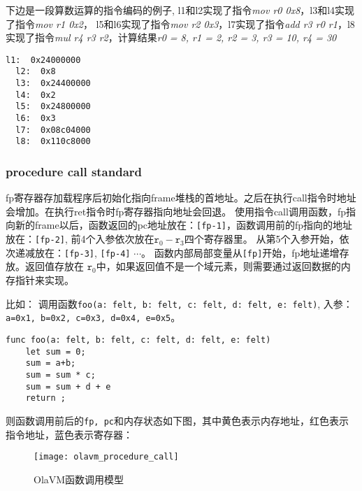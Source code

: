 下边是一段算数运算的指令编码的例子, l1和l2实现了指令\textit{mov r0 0x8}，l3和l4实现了指令\textit{mov r1 0x2}，
l5和l6实现了指令\textit{mov r2 0x3}，l7实现了指令\textit{add r3 r0 r1}，l8实现了指令\textit{mul r4 r3 r2}，计算结果\textit{r0 = 8, r1 = 2, r2 = 3, r3 = 10, r4 = 30}
\begin{lstlisting}[label={lst:inst-decode}]
  l1:  0x24000000
  l2:  0x8
  l3:  0x24400000
  l4:  0x2
  l5:  0x24800000
  l6:  0x3
  l7:  0x08c04000
  l8:  0x110c8000
\end{lstlisting}

\subsubsection{procedure call standard}\label{subsec: processor-instructions-executor-abi}

fp寄存器存加载程序后初始化指向frame堆栈的首地址。之后在执行call指令时地址会增加。在执行ret指令时fp寄存器指向地址会回退。
使用指令call调用函数，fp指向新的frame以后，函数返回的pc地址放在：\texttt{[fp-1]}，函数调用前的fp指向的地址放在：\texttt{[fp-2]}, 前4个入参依次放在$\texttt{r}_0 - \texttt{r}_{3}$四个寄存器里。
从第5个入参开始，依次递减放在：\texttt{[fp-3]}, \texttt{[fp-4]} $\cdots$。
函数内部局部变量从\texttt{[fp]}开始，fp地址递增存放。返回值存放在 $\texttt{r}_0$中，如果返回值不是一个域元素，则需要通过返回数据的内存指针来实现。

比如： 调用函数\texttt{foo(a: felt, b: felt, c: felt, d: felt, e: felt)}, 入参：\texttt{a=0x1, b=0x2, c=0x3, d=0x4, e=0x5}。
\begin{lstlisting}[label={lst:function_call}]
func foo(a: felt, b: felt, c: felt, d: felt, e: felt)
    let sum = 0;
    sum = a+b;
    sum = sum * c;
    sum = sum + d + e
    return ;
\end{lstlisting}

则函数调用前后的\texttt{fp, pc}和内存状态如下图，其中黄色表示内存地址，红色表示指令地址，蓝色表示寄存器：
\begin{figure}[!htp]
    \centering
    \texttt{[image: olavm\_procedure\_call]}
    \caption{OlaVM函数调用模型}
    \label{fig:processor call}
\end{figure}


